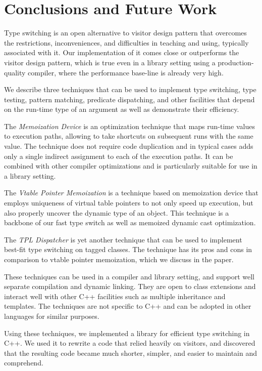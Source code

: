 \section{Conclusions and Future Work} %
\label{sec:cc}

Type switching is an open alternative to visitor design pattern that overcomes 
the restrictions, inconveniences, and difficulties in teaching and using, 
typically associated with it. Our implementation of it comes close or 
outperforms the visitor design pattern, which is true even in a library setting 
using a production-quality compiler, where the performance base-line is 
already very high.

We describe three techniques that can be used to implement type switching, type 
testing, pattern matching, predicate dispatching, and other facilities that 
depend on the run-time type of an argument as well as demonstrate their efficiency.

The \emph{Memoization Device} is an optimization technique that maps run-time values 
to execution paths, allowing to take shortcuts on subsequent runs with the same 
value. The technique does not require code duplication and in typical cases adds 
only a single indirect assignment to each of the execution paths. It can be 
combined with other compiler optimizations and is particularly suitable for use 
in a library setting.

The \emph{Vtable Pointer Memoization} is a technique based on memoization device that 
employs uniqueness of virtual table pointers to not only speed up execution, but 
also properly uncover the dynamic type of an object. This technique is a 
backbone of our fast type switch as well as memoized dynamic cast optimization.

The \emph{TPL Dispatcher} is yet another technique that can be used to 
implement best-fit type switching on tagged classes. The technique has its pros 
and cons in comparison to vtable pointer memoization, which we discuss in the paper.

These techniques can be used in a compiler and library setting, and support well 
separate compilation and dynamic linking. They are open to class extensions and 
interact well with other C++ facilities such as multiple inheritance and 
templates. The techniques are not specific to C++ and can be adopted in other 
languages for similar purposes.

Using these techniques, we implemented a library for efficient type switching 
in C++. We used it to rewrite a code that relied heavily on 
visitors, and discovered that the resulting code became much shorter, simpler, 
and easier to maintain and comprehend.
